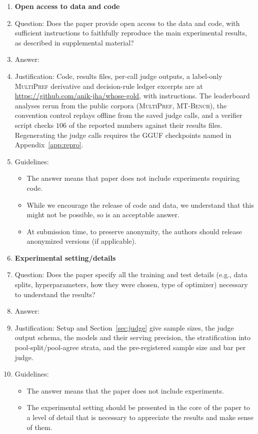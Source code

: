 \documentclass{article}
\begin{document}
\begin{enumerate}
\item {\bf Open access to data and code}
    \item[] Question: Does the paper provide open access to the data and code, with sufficient instructions to faithfully reproduce the main experimental results, as described in supplemental material?
    \item[] Answer: \answerYes{}
    \item[] Justification: Code, results files, per-call judge outputs, a label-only \textsc{MultiPref} derivative and decision-rule ledger excerpts are at \url{https://github.com/anik-jha/whose-gold}, with instructions. The leaderboard analyses rerun from the public corpora (\textsc{MultiPref}, \textsc{MT-Bench}), the convention control replays offline from the saved judge calls, and a verifier script checks $106$ of the reported numbers against their results files. Regenerating the judge calls requires the GGUF checkpoints named in Appendix~\ref{app:repro}.
    \item[] Guidelines:
    \begin{itemize}
        \item The answer \answerNA{} means that paper does not include experiments requiring code.
        \item While we encourage the release of code and data, we understand that this might not be possible, so \answerNo{} is an acceptable answer.
        \item At submission time, to preserve anonymity, the authors should release anonymized versions (if applicable).
    \end{itemize}

\item {\bf Experimental setting/details}
    \item[] Question: Does the paper specify all the training and test details (e.g., data splits, hyperparameters, how they were chosen, type of optimizer) necessary to understand the results?
    \item[] Answer: \answerYes{}
    \item[] Justification: Setup and Section~\ref{sec:judge} give sample sizes, the judge output schema, the models and their serving precision, the stratification into pool-split/pool-agree strata, and the pre-registered sample size and bar per judge.
    \item[] Guidelines:
    \begin{itemize}
        \item The answer \answerNA{} means that the paper does not include experiments.
        \item The experimental setting should be presented in the core of the paper to a level of detail that is necessary to appreciate the results and make sense of them.
    \end{itemize}


\end{enumerate}
\end{document}
